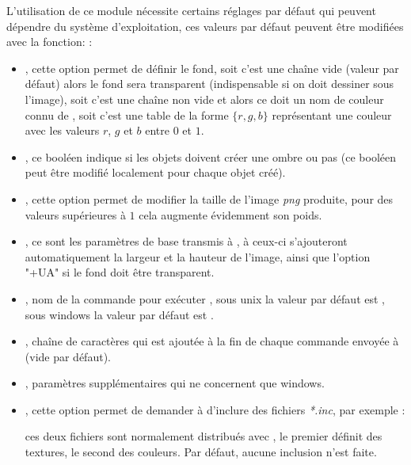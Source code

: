 L'utilisation de ce module nécessite certains réglages par défaut qui peuvent dépendre du système d'exploitation, ces valeurs par défaut peuvent être modifiées avec la fonction: 
\writeoptions :
\begin{itemize}
    \item {}, cette option permet de définir le fond, soit c'est une chaîne vide (valeur par défaut) alors le fond sera transparent (indispensable si on doit dessiner sous l'image), soit c'est une chaîne non vide et alors ce doit un nom de couleur connu de \povray, soit c'est une table de la forme $\{r,g,b\}$ représentant une couleur avec les valeurs $r$, $g$ et $b$ entre $0$ et $1$.
    
    \item {}, ce booléen indique si les objets doivent créer une ombre ou pas (ce booléen peut être modifié localement pour chaque objet créé).
    
    \item {}, cette option permet de modifier la taille de l'image \emph{png} produite, pour des valeurs supérieures à $1$ cela augmente évidemment son poids.
    
    \item {}, ce sont les paramètres de base transmis à \povray, à ceux-ci s'ajouteront automatiquement la largeur et la hauteur de l'image, ainsi que l'option "+UA" si le fond doit être transparent.
    
    \item {}, nom de la commande pour exécuter \povray, sous unix la valeur par défaut est , sous windows la valeur par défaut est .
    
    \item {}, chaîne de caractères qui est ajoutée à la fin de chaque commande envoyée à \povray (vide par défaut).
    
    \item {}, paramètres supplémentaires qui ne concernent que windows.
    
    \item {}, cette option permet de demander à \povray d'inclure des fichiers \emph{*.inc}, par exemple : \par
    \hfil{}\hfil\par ces deux fichiers sont normalement distribués avec \povray, le premier définit des textures, le second des couleurs. Par défaut, aucune inclusion n'est faite.
\end{itemize}

